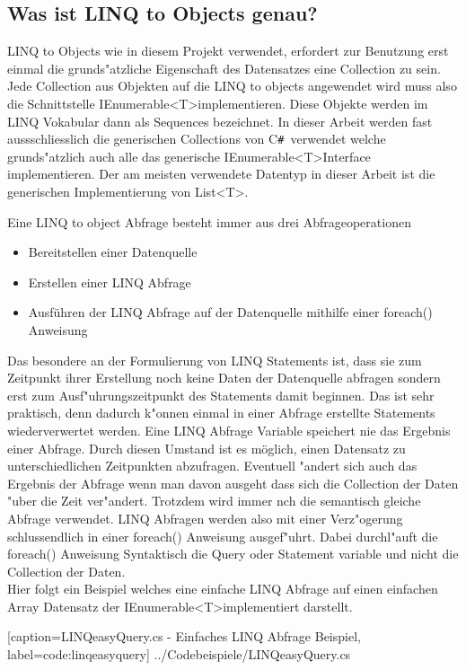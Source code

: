 \documentclass[pagesize, paper=a4, fontsize=12pt,titlepage=true, headings=small, headnosepline, abstractoff, liststotoc, nochapterprefix, plainheadsepline]{scrreprt}
\newcommand{\CSS}{C\texttt{\# }}
\newcommand{\GT}{\textless T\textgreater}
\newcommand{\GTS}{\textless T\textgreater\space}
\begin{document}
		\subsection {Was ist LINQ to Objects genau? }
		LINQ to Objects wie in diesem Projekt verwendet, erfordert zur Benutzung erst einmal die grunds"atzliche Eigenschaft des Datensatzes eine Collection zu sein. Jede Collection aus Objekten auf die LINQ to objects angewendet wird muss also die Schnittstelle IEnumerable\GTS implementieren. Diese Objekte werden im LINQ Vokabular dann als Sequences bezeichnet. In dieser Arbeit werden fast aussschliesslich die generischen Collections von \CSS verwendet welche grunds"atzlich auch alle das generische IEnumerable\GTS Interface implementieren. Der am meisten verwendete Datentyp in dieser Arbeit ist die generischen Implementierung von List\GT.

Eine LINQ to object Abfrage besteht immer aus drei Abfrageoperationen
\begin{itemize}
\item Bereitstellen einer Datenquelle
\item Erstellen einer LINQ Abfrage
\item Ausführen der LINQ Abfrage auf der Datenquelle mithilfe einer foreach() Anweisung
\end{itemize}
Das besondere an der Formulierung von LINQ Statements ist, dass sie zum Zeitpunkt ihrer Erstellung noch keine Daten der Datenquelle abfragen sondern erst zum Ausf"uhrungszeitpunkt des Statements damit beginnen. Das ist sehr praktisch, denn dadurch k"onnen einmal in einer Abfrage erstellte Statements wiederverwertet werden. Eine LINQ Abfrage Variable speichert nie das Ergebnis einer Abfrage. Durch diesen Umstand ist es möglich, einen Datensatz zu unterschiedlichen Zeitpunkten abzufragen. Eventuell "andert sich auch das Ergebnis der Abfrage wenn man davon ausgeht dass sich die Collection der Daten "uber die Zeit ver"andert. Trotzdem wird immer nch die semantisch gleiche Abfrage verwendet. LINQ Abfragen werden also mit einer Verz"ogerung schlussendlich in einer foreach() Anweisung ausgef"uhrt. Dabei durchl"auft die foreach() Anweisung Syntaktisch die Query oder Statement variable und nicht die Collection der Daten.
\\
Hier folgt ein Beispiel welches eine einfache LINQ Abfrage auf einen einfachen Array Datensatz der IEnumerable\GTS implementiert darstellt.

			[caption={LINQeasyQuery.cs - Einfaches LINQ Abfrage Beispiel}, label=code:linqeasyquery]
			{../Codebeispiele/LINQeasyQuery.cs}
\end{document}
